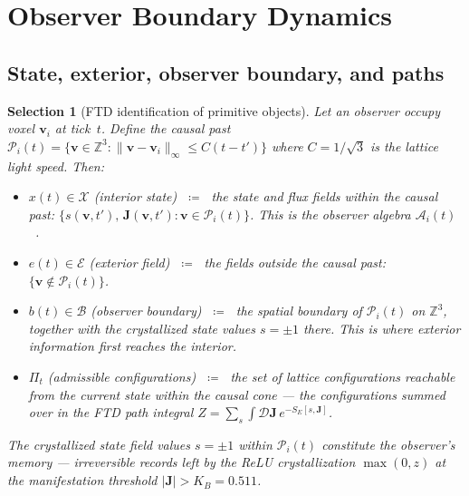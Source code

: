 \documentclass[11pt]{article}
\theoremstyle{tight}
\theoremstyle{plainroman}
\newtheorem{selection}[theorem]{Selection}
\newcommand{\Z}{\mathbb{Z}}
\newcommand{\causal}{\mathcal{P}}
\begin{document}
\section{Observer Boundary Dynamics}

\subsection{State, exterior, observer boundary, and paths}

\begin{selection}[FTD identification of primitive objects]
Let an observer occupy voxel $\mathbf v_i$ at tick~$t$.
Define the \emph{causal past} $\causal_i(t)=\{\mathbf v\in\Z^3:\|\mathbf v-\mathbf v_i\|_\infty\le C(t-t')\}$ where $C=1/\sqrt{3}$ is the lattice light speed.
Then:
\begin{itemize}[nosep]
\item $x(t)\in\mathcal X$ (interior state) $\;\coloneqq\;$ the state and flux fields within the causal past: $\{s(\mathbf v,t'),\,\mathbf J(\mathbf v,t'):\mathbf v\in\causal_i(t)\}$.
This is the \emph{observer algebra} $\mathcal A_i(t)$~\cite{ftdvnc}.
\item $e(t)\in\mathcal E$ (exterior field) $\;\coloneqq\;$ the fields outside the causal past: $\{\mathbf v\notin\causal_i(t)\}$.
\item $b(t)\in\mathcal B$ (observer boundary) $\;\coloneqq\;$ the spatial boundary of $\causal_i(t)$ on $\Z^3$, together with the crystallized state values $s=\pm 1$ there.
This is where exterior information first reaches the interior.
\item $\Pi_t$ (admissible configurations) $\;\coloneqq\;$ the set of lattice configurations reachable from the current state within the causal cone --- the configurations summed over in the FTD path integral $Z=\sum_s\int\mathcal D\mathbf J\,e^{-S_E[s,\mathbf J]}$.
\end{itemize}
The crystallized state field values $s=\pm 1$ within $\causal_i(t)$ constitute the observer's \emph{memory} --- irreversible records left by the ReLU crystallization $\max(0,z)$ at the manifestation threshold $|\mathbf J|>K_B=0.511$.
\end{selection}
\end{document}
